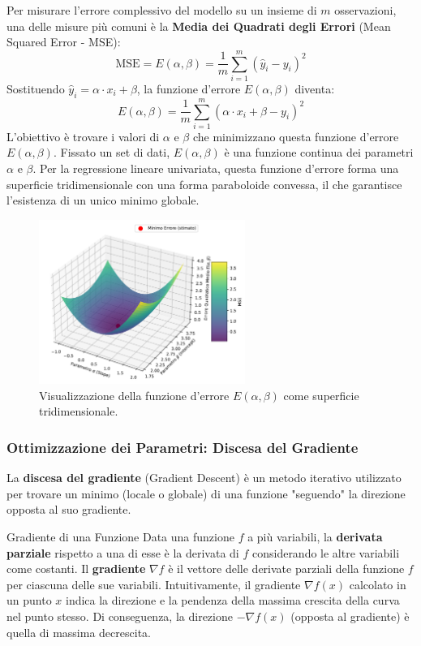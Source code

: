 \documentclass{article}
\begin{document}
Per misurare l'errore complessivo del modello su un insieme di $m$ osservazioni, una delle misure più comuni è la \textbf{Media dei Quadrati degli Errori} (Mean Squared Error - MSE):
$$ \text{MSE} = E(\alpha, \beta) = \frac{1}{m} \sum_{i=1}^{m} (\hat{y}_i - y_i)^2 $$
Sostituendo $\hat{y}_i = \alpha \cdot x_i + \beta$, la funzione d'errore $E(\alpha, \beta)$ diventa:
$$ E(\alpha, \beta) = \frac{1}{m} \sum_{i=1}^{m} (\alpha \cdot x_i + \beta - y_i)^2 $$
L'obiettivo è trovare i valori di $\alpha$ e $\beta$ che minimizzano questa funzione d'errore $E(\alpha, \beta)$.  Fissato un set di dati, $E(\alpha, \beta)$ è una funzione continua dei parametri $\alpha$ e $\beta$.  Per la regressione lineare univariata, questa funzione d'errore forma una superficie tridimensionale con una forma paraboloide convessa, il che garantisce l'esistenza di un unico minimo globale.

\begin{figure}[H]
    \centering
    \includegraphics[width=0.6\textwidth]{images/error_function_3d.pdf}
    \caption{Visualizzazione della funzione d'errore $E(\alpha, \beta)$ come superficie tridimensionale.}
    \label{fig:error_function_3d}
\end{figure}

\subsubsection{Ottimizzazione dei Parametri: Discesa del Gradiente}
La \textbf{discesa del gradiente} (Gradient Descent) è un metodo iterativo utilizzato per trovare un minimo (locale o globale) di una funzione "seguendo" la direzione opposta al suo gradiente.

\begin{definitionbox}{Gradiente di una Funzione}
    Data una funzione $f$ a più variabili, la \textbf{derivata parziale} rispetto a una di esse è la derivata di $f$ considerando le altre variabili come costanti.
    Il \textbf{gradiente} $\nabla f$ è il vettore delle derivate parziali della funzione $f$ per ciascuna delle sue variabili.  Intuitivamente, il gradiente $\nabla f(x)$ calcolato in un punto $x$ indica la direzione e la pendenza della massima crescita della curva nel punto stesso.  Di conseguenza, la direzione $-\nabla f(x)$ (opposta al gradiente) è quella di massima decrescita.
\end{definitionbox}
\end{document}
